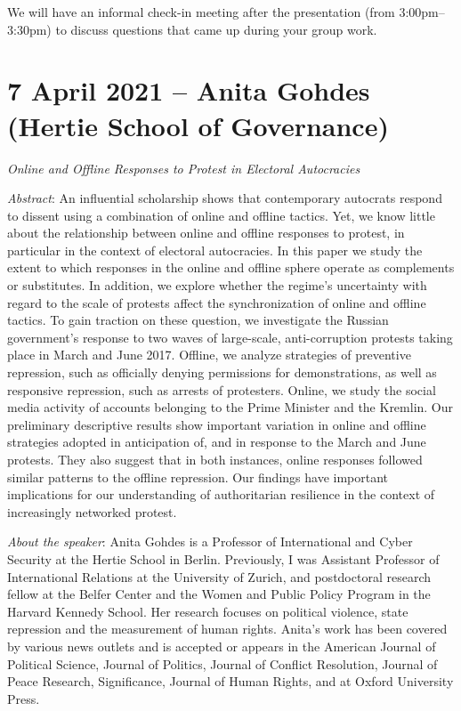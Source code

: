 \documentclass[abstract=on,parskip=full,headings=standardclasses,fontsize=11pt,paper=a4]{scrartcl}
\begin{document}
  
 
 We will have an informal check-in meeting after the presentation (from 3:00pm--3:30pm) to discuss questions that came up during your group work.
 
\section{7 April 2021 -- Anita Gohdes (Hertie School of Governance)}

 \textit{Online and Offline Responses to Protest in Electoral Autocracies}


\textit{Abstract}: An influential scholarship shows that contemporary autocrats respond to dissent using a combination of online and offline tactics. Yet, we know little about the relationship between online and offline responses to protest, in particular in the context of electoral autocracies. In this paper we study the extent to which responses in the online and offline sphere operate as complements or substitutes. In addition, we explore whether the regime’s uncertainty with regard to the scale of protests affect the synchronization of online and offline tactics. To gain traction on these question, we investigate the Russian government’s response to two waves of large-scale, anti-corruption protests taking place in March and June 2017. Offline, we analyze strategies of preventive repression, such as officially denying permissions for demonstrations, as well as responsive repression, such as arrests of protesters. Online, we study the social media activity of accounts belonging to the Prime Minister and the Kremlin. Our preliminary descriptive results show important variation in online and offline strategies adopted in anticipation of, and in response to the March and June protests. They also suggest that in both instances, online responses followed similar patterns to the offline repression. Our findings have important implications for our understanding of authoritarian resilience in the context of increasingly networked protest.


\textit{About the speaker}: Anita Gohdes is a Professor of International and Cyber Security at the Hertie School in Berlin. Previously, I was Assistant Professor of International Relations at the University of Zurich, and postdoctoral research fellow at the Belfer Center and the Women and Public Policy Program in the Harvard Kennedy School. Her research focuses on political violence, state repression and the measurement of human rights. Anita's work has been covered by various news outlets and is accepted or appears in the American Journal of Political Science,  Journal of Politics, Journal of Conflict Resolution, Journal of Peace Research, Significance, Journal of Human Rights, and at Oxford University Press. 
\end{document}
